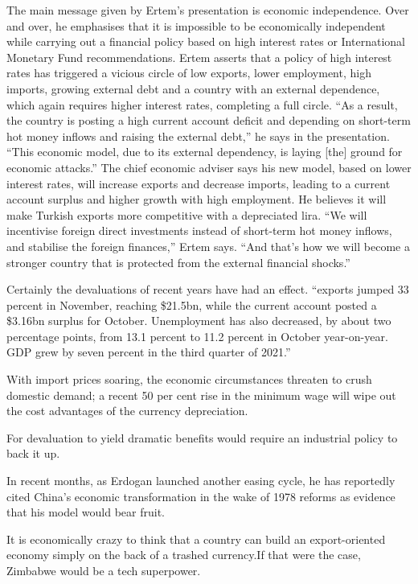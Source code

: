 \documentclass[
]{book}
\begin{document}
The main message given by Ertem's presentation is economic independence. Over and over, he emphasises that it is impossible to be economically independent while carrying out a financial policy based on high interest rates or International Monetary Fund recommendations. Ertem asserts that a policy of high interest rates has triggered a vicious circle of low exports, lower employment, high imports, growing external debt and a country with an external dependence, which again requires higher interest rates, completing a full circle. ``As a result, the country is posting a high current account deficit and depending on short-term hot money inflows and raising the external debt,'' he says in the presentation. ``This economic model, due to its external dependency, is laying {[}the{]} ground for economic attacks.'' The chief economic adviser says his new model, based on lower interest rates, will increase exports and decrease imports, leading to a current account surplus and higher growth with high employment. He believes it will make Turkish exports more competitive with a depreciated lira. ``We will incentivise foreign direct investments instead of short-term hot money inflows, and stabilise the foreign finances,'' Ertem says. ``And that's how we will become a stronger country that is protected from the external financial shocks.''

Certainly the devaluations of recent years have had an effect. ``exports jumped 33 percent in November, reaching \$21.5bn, while the current account posted a \$3.16bn surplus for October. Unemployment has also decreased, by about two percentage points, from 13.1 percent to 11.2 percent in October year-on-year. GDP grew by seven percent in the third quarter of 2021.''

With import prices soaring, the economic circumstances threaten to crush domestic demand; a recent 50 per cent rise in the minimum wage will wipe out the cost advantages of the currency depreciation.

For devaluation to yield dramatic benefits would require an industrial policy to back it up.

In recent months, as Erdogan launched another easing cycle, he has reportedly cited China's economic transformation in the wake of 1978 reforms as evidence that his model would bear fruit.

It is economically crazy to think that a country can build an export-oriented economy simply on the back of a trashed currency.If that were the case, Zimbabwe would be a tech superpower.
\end{document}

